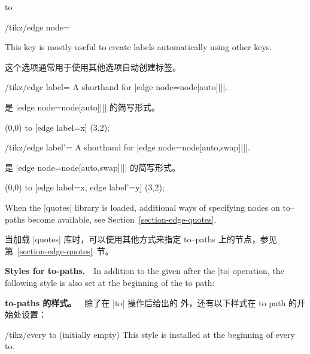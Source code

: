 \begin{pathoperation}{to}{
         }
\begin{key}{/tikz/edge node=}
\begin{codeexample}[]
\end{codeexample}
        This key is mostly useful to create labels automatically using other
        keys.
        
        这个选项通常用于使用其他选项自动创建标签。


    \end{key}
    \begin{key}{/tikz/edge label=}
        A shorthand for |edge node={node[auto]{||}}|.

        是 |edge node={node[auto]{||}}| 的简写形式。

\begin{codeexample}[]
\tikz \draw (0,0) to [edge label=x] (3,2);
\end{codeexample}
    \end{key}
    \begin{key}{/tikz/edge label'=}
        A shorthand for |edge node={node[auto,swap]{||}}|.

        是 |edge node={node[auto,swap]{||}}| 的简写形式。

\begin{codeexample}[]
\tikz \draw (0,0) to [edge label=x, edge label'=y] (3,2);
\end{codeexample}
    \end{key}

    When the |quotes| library is loaded, additional ways of specifying nodes on
    to--paths become available, see Section~\ref{section-edge-quotes}.

    当加载 |quotes| 库时，可以使用其他方式来指定 to--paths 上的节点，参见第~\ref{section-edge-quotes}~节。

    \medskip
    \textbf{Styles for to-paths.}\ \
    In addition to the  given after the |to| operation, the
    following style is also set at the beginning of the to path:

    \textbf{to-paths 的样式。}\ \
除了在 |to| 操作后给出的  外，还有以下样式在 to path 的开始处设置：
    \begin{stylekey}{/tikz/every to (initially \normalfont empty)}
        This style is installed at the beginning of every to.


\end{stylekey}
\end{pathoperation}
